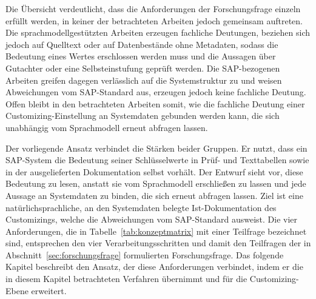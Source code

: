 Die Übersicht verdeutlicht, dass die Anforderungen der Forschungsfrage einzeln erfüllt werden, in keiner der betrachteten Arbeiten jedoch gemeinsam auftreten. Die sprachmodellgestützten Arbeiten erzeugen fachliche Deutungen, beziehen sich jedoch auf Quelltext oder auf Datenbestände ohne Metadaten, sodass die Bedeutung eines Wertes erschlossen werden muss und die Aussagen über Gutachter oder eine Selbsteinstufung geprüft werden. Die SAP-bezogenen Arbeiten greifen dagegen verlässlich auf die Systemstruktur zu und weisen Abweichungen vom SAP-Standard aus, erzeugen jedoch keine fachliche Deutung. Offen bleibt in den betrachteten Arbeiten somit, wie die fachliche Deutung einer Customizing-Einstellung an Systemdaten gebunden werden kann, die sich unabhängig vom Sprachmodell erneut abfragen lassen.

Der vorliegende Ansatz verbindet die Stärken beider Gruppen. Er nutzt, dass ein SAP-System die Bedeutung seiner Schlüsselwerte in Prüf- und Texttabellen sowie in der ausgelieferten Dokumentation selbst vorhält. Der Entwurf sieht vor, diese Bedeutung zu lesen, anstatt sie vom Sprachmodell erschließen zu lassen und jede Aussage an Systemdaten zu binden, die sich erneut abfragen lassen. Ziel ist eine natürlichsprachliche, an den Systemdaten belegte Ist-Dokumentation des Customizings, welche die Abweichungen vom SAP-Standard ausweist. Die vier Anforderungen, die in Tabelle~\ref{tab:konzeptmatrix} mit einer Teilfrage bezeichnet sind, entsprechen den vier Verarbeitungsschritten und damit den Teilfragen der in Abschnitt~\ref{sec:forschungsfrage} formulierten Forschungsfrage. Das folgende Kapitel beschreibt den Ansatz, der diese Anforderungen verbindet, indem er die in diesem Kapitel betrachteten Verfahren übernimmt und für die Customizing-Ebene erweitert.